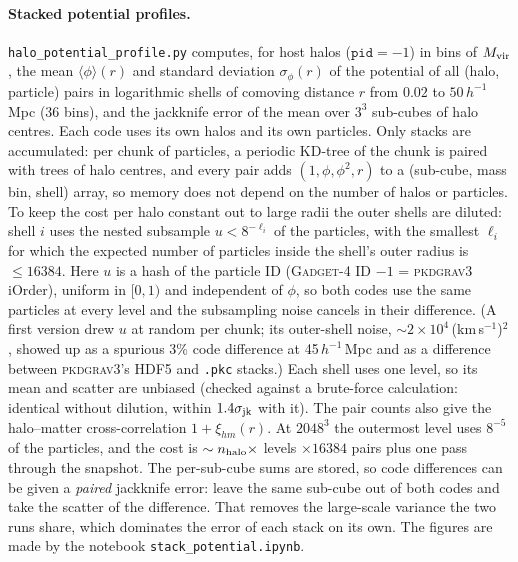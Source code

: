 \documentclass[11pt,a4paper]{article}
\newcommand{\pkd}{\textsc{pkdgrav3}}
\newcommand{\gad}{\textsc{Gadget-4}}
\newcommand{\fp}[1]{\nolinkurl{#1}}
\newcommand{\kms}{(km\,s$^{-1}$)$^2$}
\newcommand{\Mpch}{$h^{-1}$\,Mpc}
\begin{document}
\paragraph{Stacked potential profiles.}
\label{sec:stack}
\fp{halo_potential_profile.py} computes, for host halos ($\texttt{pid} = -1$) in bins of $M_{\rm vir}$, the mean
$\langle\phi\rangle(r)$ and standard deviation $\sigma_\phi(r)$ of the potential of all (halo, particle) pairs in
logarithmic shells of comoving distance $r$ from $0.02$ to $50$\,\Mpch{} (36 bins), and the jackknife error of the
mean over $3^3$ sub-cubes of halo centres. Each code uses its own halos and its own particles. Only stacks are
accumulated: per chunk of particles, a periodic KD-tree of the chunk is paired with trees of halo centres, and every
pair adds $(1, \phi, \phi^2, r)$ to a (sub-cube, mass bin, shell) array, so memory does not depend on the number of
halos or particles. To keep the cost per halo constant out to large radii the outer shells are diluted: shell $i$
uses the nested subsample $u < 8^{-\ell_i}$ of the particles, with the smallest $\ell_i$ for which the expected
number of particles inside the shell's outer radius is $\le 16384$. Here $u$ is a hash of the particle ID
(\gad{} ID $-1$ = \pkd{} iOrder), uniform in $[0,1)$ and independent of $\phi$, so both codes use the same particles at
every level and the subsampling noise cancels in their difference. (A first version drew $u$ at random per chunk; its
outer-shell noise, $\sim2\times10^4$\,\kms, showed up as a spurious 3\% code difference at 45\,\Mpch{} and as a
difference between \pkd{}'s HDF5 and \texttt{.pkc} stacks.) Each shell uses one level, so its mean and scatter are
unbiased (checked against a brute-force calculation: identical without dilution, within $1.4\sigma_{\rm jk}$ with it). The pair counts also give the halo--matter cross-correlation $1+\xi_{hm}(r)$. At
$2048^3$ the outermost level uses $8^{-5}$ of the particles, and the cost is
$\sim n_{\rm halo}\times$ levels $\times 16384$ pairs plus one pass through the snapshot. The per-sub-cube sums are
stored, so code differences can be given a \emph{paired} jackknife error: leave the same sub-cube out of both codes
and take the scatter of the difference. That removes the large-scale variance the two runs share, which dominates
the error of each stack on its own. The figures are made by the notebook \fp{stack_potential.ipynb}.
\end{document}
